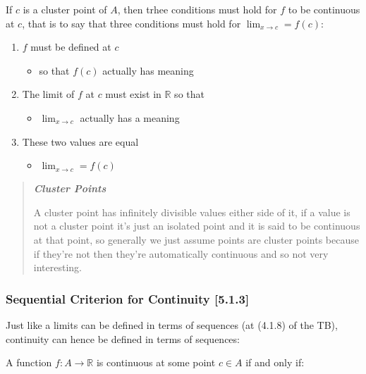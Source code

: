 \documentclass[
]{article}
\begin{document}
If \(c\) is a cluster point of \(A\), then trhee conditions must hold
for \(f\) to be continuous at \(c\), that is to say that three
conditions must hold for \(\lim_{x\rightarrow c} = f(c)\):

\begin{enumerate}
\def\labelenumi{\arabic{enumi}.}
\item
  \(f\) must be defined at \(c\)

  \begin{itemize}
  \item
    so that \(f(c)\) actually has meaning
  \end{itemize}
\item
  The limit of \(f\) at \(c\) must exist in \(\mathbb{R}\) so that

  \begin{itemize}
  \item
    \(\lim_{x\rightarrow c}\) actually has a meaning
  \end{itemize}
\item
  These two values are equal

  \begin{itemize}
  \item
    \(\lim_{x\rightarrow c} = f(c)\)
  \end{itemize}
\end{enumerate}

\begin{quote}
\textbf{\emph{Cluster Points}}

A cluster point has infinitely divisible values either side of it, if a
value is not a cluster point it's just an isolated point and it is said
to be continuous at that point, so generally we just assume points are
cluster points because if they're not then they're automatically
continuous and so not very interesting.
\end{quote}

\hypertarget{header-n3914}{%
\subsubsection{Sequential Criterion for Continuity
{[}5.1.3{]}}\label{header-n3914}}

Just like a limits can be defined in terms of sequences (at (4.1.8) of
the TB), continuity can hence be defined in terms of sequences:

A function \(f: A \rightarrow \mathbb{R}\) is continuous at some point
\(c \in A \) if and only if:
\end{document}
